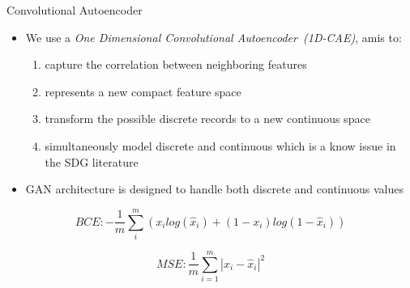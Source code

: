 \documentclass{beamer}
\begin{document}
\begin{frame}{Convolutional Autoencoder}

\begin{itemize}
    \item We use a \textit{One Dimensional Convolutional Autoencoder~(1D-CAE)}, amis to:
    \begin{enumerate}
        \item capture the correlation between neighboring features
        \item represents a new compact feature space
        \item transform the possible discrete records to a new continuous space
        \item simultaneously model discrete and continuous which is a know issue in the SDG literature
    \end{enumerate}
    
    \item GAN architecture is designed to handle both discrete and continuous values
\end{itemize}

\begin{equation}\label{eq:bce}
BCE:-\frac{1}{m}\sum_{i}^{m}\left ( x_i log(\hat{x}_i) + (1- x_i) log(1 - \hat{x}_i) \right )
\end{equation}

\begin{equation}\label{eq:mse}
MSE:\frac{1}{m}\sum_{i=1}^{m} \left |x_i - \hat{x}_i \right |^2
\end{equation}



\end{frame}
\end{document}
